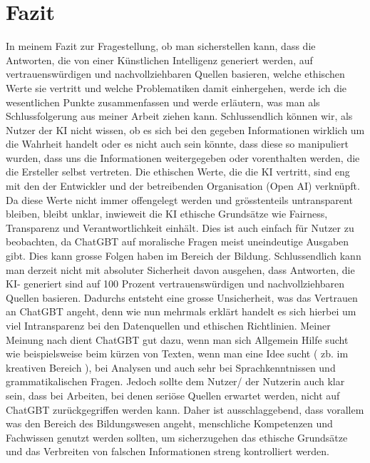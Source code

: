 \documentclass{report}
\begin{document}
\section{Fazit}
In meinem Fazit zur Fragestellung, ob man sicherstellen kann, dass die Antworten, die von einer Künstlichen Intelligenz generiert werden, auf vertrauenswürdigen und nachvollziehbaren Quellen basieren, welche ethischen Werte sie vertritt und welche Problematiken damit einhergehen, werde ich die wesentlichen Punkte zusammenfassen und werde erläutern, was man als Schlussfolgerung aus meiner Arbeit ziehen kann. Schlussendlich können wir, als Nutzer der KI nicht wissen, ob es sich bei den gegeben Informationen wirklich um die Wahrheit handelt oder es nicht auch sein könnte, dass diese so manipuliert wurden, dass uns die Informationen weitergegeben oder vorenthalten werden, die die Ersteller selbst vertreten. Die ethischen Werte, die die KI vertritt, sind eng mit den der Entwickler und der betreibenden Organisation (Open AI) verknüpft. Da diese Werte  nicht immer offengelegt werden und grösstenteils untransparent bleiben, bleibt unklar, inwieweit die KI ethische Grundsätze wie Fairness, Transparenz und Verantwortlichkeit einhält. Dies ist auch einfach für Nutzer zu beobachten, da ChatGBT auf moralische Fragen meist uneindeutige Ausgaben gibt. Dies kann grosse Folgen haben im Bereich der Bildung. Schlussendlich kann man derzeit nicht mit absoluter Sicherheit davon ausgehen, dass Antworten, die KI- generiert sind auf 100 Prozent vertrauenswürdigen und nachvollziehbaren Quellen basieren. Dadurchs entsteht eine grosse Unsicherheit, was das Vertrauen an ChatGBT angeht, denn wie nun mehrmals erklärt handelt es sich hierbei um viel Intransparenz bei den Datenquellen und ethischen Richtlinien. Meiner Meinung nach dient ChatGBT gut dazu, wenn man sich Allgemein Hilfe sucht wie beispielsweise beim kürzen von Texten, wenn man eine Idee sucht ( zb. im kreativen Bereich ), bei Analysen und auch sehr bei Sprachkenntnissen und grammatikalischen Fragen. Jedoch sollte dem Nutzer/ der Nutzerin auch klar sein, dass bei Arbeiten, bei denen seriöse Quellen erwartet werden, nicht auf ChatGBT zurückgegriffen werden kann. Daher ist ausschlaggebend, dass vorallem was den Bereich des Bildungswesen angeht, menschliche Kompetenzen und Fachwissen genutzt werden sollten, um sicherzugehen das ethische Grundsätze und das Verbreiten von falschen Informationen streng kontrolliert werden.
 
\nocite{*}
\printbibliography
\end{document}
